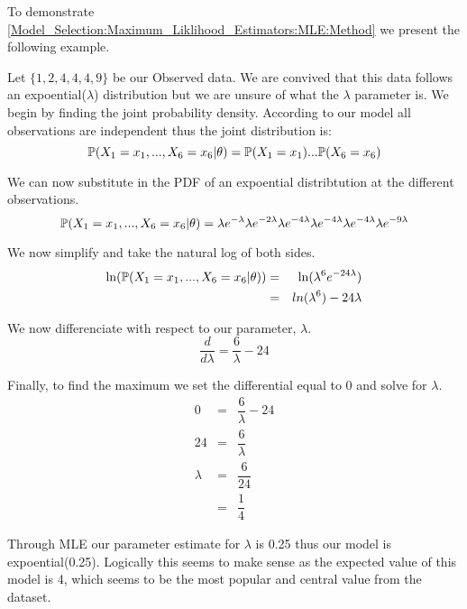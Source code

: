     \begin{example}
        \label{Model_Selection:Maximum_Liklihood_Estimators:MLE:Example}
        To demonstrate \ref{Model_Selection:Maximum_Liklihood_Estimators:MLE:Method} we present the following example. 

        Let $\{1,2,4,4,4,9\}$ be our Observed data. We are convived that this data follows an expoential($\lambda$) distribution but we are unsure of what the $\lambda$ parameter is. We begin by finding the joint probability density. According to our model all observations are independent thus the joint distribution is:
        \begin{equation}
            \mathbb{P}(X_1 = x_1,...,X_6=x_6|\theta) = \mathbb{P}(X_1 = x_1)...\mathbb{P}(X_6 = x_6)
        \end{equation}

        We can now substitute in the PDF of an expoential distribtution at the different observations.
        \begin{equation}
            \mathbb{P}(X_1 = x_1,...,X_6=x_6|\theta) = \lambda e^{-\lambda} \lambda e^{-2\lambda} \lambda e^{-4\lambda} \lambda e^{-4\lambda} \lambda e^{-4\lambda} \lambda e^{-9\lambda}
        \end{equation}

        We now simplify and take the natural log of both sides.
        \begin{eqnarray}
            \ln(\mathbb{P}(X_1 = x_1,...,X_6=x_6|\theta)) & = &  \ln(\lambda^6 e^{-24\lambda}) \\
            & = & ln(\lambda^6) - 24\lambda 
        \end{eqnarray}

        We now differenciate with respect to our parameter, $\lambda$.
        \begin{equation}
            \dfrac{d}{d\lambda} = \dfrac{6}{\lambda} - 24
        \end{equation}

        Finally, to find the maximum we set the differential equal to 0 and solve for $\lambda$.
        \begin{eqnarray}
            0 & = & \dfrac{6}{\lambda} - 24 \\
            24 & = & \dfrac{6}{\lambda} \\
            \lambda & = & \dfrac{6}{24} \\
            & = & \dfrac{1}{4}    
        \end{eqnarray}

        Through MLE our parameter estimate for $\lambda$ is 0.25 thus our model is expoential(0.25). Logically this seems to make sense as the expected value of this model is 4, which seems to be the most popular and central value from the dataset.
    \end{example}


